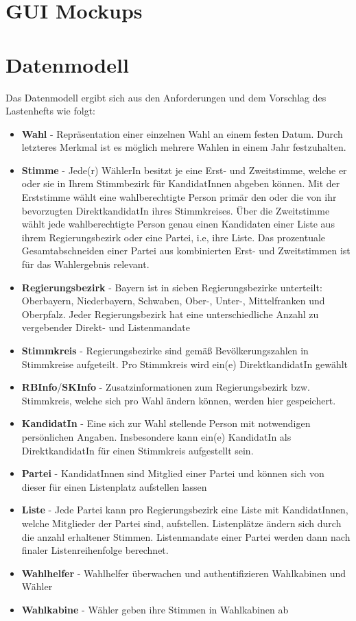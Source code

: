 \documentclass[a4paper,12pt]{article}
\begin{document}
\section{GUI Mockups}


\section{Datenmodell}
Das Datenmodell ergibt sich aus den Anforderungen und dem Vorschlag des Lastenhefts wie folgt:
\begin{itemize}
  \item \textbf{Wahl} - Repräsentation einer einzelnen Wahl an einem festen Datum. 
        Durch letzteres Merkmal ist es möglich mehrere Wahlen in einem Jahr festzuhalten.
  \item \textbf{Stimme} - Jede(r) WählerIn besitzt je eine Erst- und Zweitstimme, welche er oder sie in Ihrem
        Stimmbezirk für KandidatInnen abgeben können. Mit der Erststimme wählt eine wahlberechtigte Person
        primär den oder die von ihr bevorzugten DirektkandidatIn ihres Stimmkreises. Über die Zweitstimme wählt 
        jede wahlberechtigte Person genau einen Kandidaten einer Liste aus ihrem Regierungsbezirk oder eine Partei, i.e, ihre Liste. 
        Das prozentuale Gesamtabschneiden einer Partei aus kombinierten Erst- und Zweitstimmen ist für das 
        Wahlergebnis relevant.
  \item \textbf{Regierungsbezirk} - Bayern ist in sieben Regierungsbezirke unterteilt: Oberbayern,
        Niederbayern, Schwaben, Ober-, Unter-, Mittelfranken und Oberpfalz. Jeder Regierungsbezirk
        hat eine unterschiedliche Anzahl zu vergebender Direkt- und Listenmandate
  \item \textbf{Stimmkreis} - Regierungsbezirke sind gemäß Bevölkerungszahlen in Stimmkreise aufgeteilt.
        Pro Stimmkreis wird ein(e) DirektkandidatIn gewählt
  \item \textbf{RBInfo}/\textbf{SKInfo} - Zusatzinformationen zum Regierungsbezirk bzw. Stimmkreis,
        welche sich pro Wahl ändern können, werden hier gespeichert.
  \item \textbf{KandidatIn} - Eine sich zur Wahl stellende Person mit notwendigen persönlichen Angaben. 
        Insbesondere kann ein(e) KandidatIn als DirektkandidatIn für einen Stimmkreis aufgestellt sein.
  \item \textbf{Partei} - KandidatInnen sind Mitglied einer Partei und können sich von dieser für einen 
        Listenplatz aufstellen lassen
  \item \textbf{Liste} - Jede Partei kann pro Regierungsbezirk eine Liste mit KandidatInnen, welche Mitglieder der 
        Partei sind, aufstellen. Listenplätze ändern sich durch die anzahl erhaltener Stimmen. Listenmandate
        einer Partei werden dann nach finaler Listenreihenfolge berechnet.
  \item \textbf{Wahlhelfer} - Wahlhelfer überwachen und authentifizieren Wahlkabinen und Wähler
  \item \textbf{Wahlkabine} - Wähler geben ihre Stimmen in Wahlkabinen ab
\end{itemize}
\end{document}
